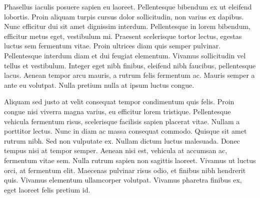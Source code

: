 \documentclass[12pt]{article}
\begin{document}
Phasellus iaculis posuere sapien eu laoreet. Pellentesque bibendum ex ut eleifend lobortis. Proin aliquam turpis cursus dolor sollicitudin, non varius ex dapibus. Nunc efficitur dui sit amet dignissim interdum. Pellentesque in lorem bibendum, efficitur metus eget, vestibulum mi. Praesent scelerisque tortor lectus, egestas luctus sem fermentum vitae. Proin ultrices diam quis semper pulvinar. Pellentesque interdum diam et dui feugiat elementum. Vivamus sollicitudin vel tellus et vestibulum. Integer eget nibh finibus, eleifend nibh faucibus, pellentesque lacus. Aenean tempor arcu mauris, a rutrum felis fermentum ac. Mauris semper a ante eu volutpat. Nulla pretium nulla at ipsum luctus congue.

Aliquam sed justo at velit consequat tempor condimentum quis felis. Proin congue nisi viverra magna varius, eu efficitur lorem tristique. Pellentesque vehicula fermentum risus, scelerisque facilisis sapien placerat vitae. Nullam a porttitor lectus. Nunc in diam ac massa consequat commodo. Quisque sit amet rutrum nibh. Sed non vulputate ex. Nullam dictum luctus malesuada. Donec tempus nisi at tempor semper. Aenean nisi est, vehicula at accumsan ac, fermentum vitae sem. Nulla rutrum sapien non sagittis laoreet. Vivamus ut luctus orci, at fermentum elit. Maecenas pulvinar risus odio, et finibus nibh hendrerit quis. Vivamus elementum ullamcorper volutpat. Vivamus pharetra finibus ex, eget laoreet felis pretium id. 
\clearpage





\clearpage
\end{document}
